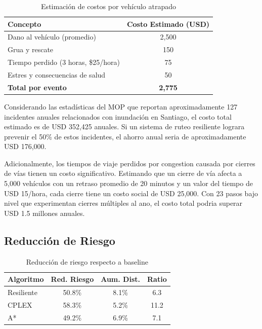 \documentclass[conference]{IEEEtran}
\begin{document}
\begin{table}[!t]
\centering
\caption{Estimación de costos por vehículo atrapado}
\begin{tabular}{@{}lc@{}}
\toprule
\textbf{Concepto} & \textbf{Costo Estimado (USD)} \\
\midrule
Dano al vehículo (promedio) & 2,500 \\
Grua y rescate & 150 \\
Tiempo perdido (3 horas, \$25/hora) & 75 \\
Estres y consecuencias de salud & 50 \\
\midrule
\textbf{Total por evento} & \textbf{2,775} \\
\bottomrule
\end{tabular}
\end{table}

Considerando las estadísticas del MOP que reportan aproximadamente 127 incidentes anuales relacionados con inundación en Santiago, el costo total estimado es de USD 352,425 anuales. Si un sistema de ruteo resiliente lograra prevenir el 50\% de estos incidentes, el ahorro anual seria de aproximadamente USD 176,000.

Adicionalmente, los tiempos de viaje perdidos por congestion causada por cierres de vías tienen un costo significativo. Estimando que un cierre de vía afecta a 5,000 vehículos con un retraso promedio de 20 minutos y un valor del tiempo de USD 15/hora, cada cierre tiene un costo social de USD 25,000. Con 23 pasos bajo nivel que experimentan cierres múltiples al ano, el costo total podria superar USD 1.5 millones anuales.

\subsection{Reducción de Riesgo}

\begin{table}[!t]
\centering
\caption{Reducción de riesgo respecto a baseline}
\begin{tabular}{@{}lccc@{}}
\toprule
\textbf{Algoritmo} & \textbf{Red. Riesgo} & \textbf{Aum. Dist.} & \textbf{Ratio} \\
\midrule
Resiliente & 50.8\% & 8.1\% & 6.3 \\
CPLEX & 58.3\% & 5.2\% & 11.2 \\
A* & 49.2\% & 6.9\% & 7.1 \\
\bottomrule
\end{tabular}
\end{table}
\end{document}
